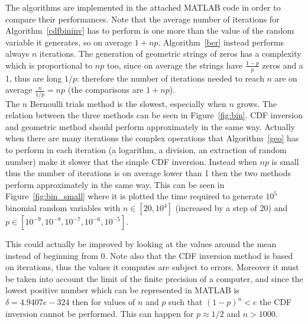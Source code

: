 \documentclass[10pt]{article}
\begin{document}
The algorithms are implemented in the attached MATLAB code in order to compare their performances. Note that the average number of iterations for Algorithm~\ref{cdfbininv} has to perform is one more than the value of the random variable it generates, so on average $1 + np$. Algorithm~\ref{ber} instead performs always $n$ iterations. The generation of geometric strings of zeros has a complexity which is proportional to $np$ too, since on average the strings have $\frac{1-p}{p}$ zeros and a 1, thus are long $1/p$: therefore the number of iterations needed to reach $n$ are on average $\frac{n}{1/p} = np$ (the comparisons are $1+np$). \\
The $n$ Bernoulli trials method is the slowest, especially when $n$ grows. The relation between the three methods can be seen in Figure~\ref{fig:bin}. CDF inversion and geometric method should perform approximately in the same way. Actually when there are many iterations the complex operations that Algorithm~\ref{geo} has to perform in each iteration (a logarithm, a division, an extraction of random number) make it slower that the simple CDF inversion. Instead when $np$ is small thus the number of iterations is on average lower than 1 then the two methods perform approximately in the same way. This can be seen in Figure~\ref{fig:bin_small} where it is plotted the time required to generate $10^5$ binomial random variables with $n\in [20, 10^4]$ (increased by a step of 20) and $p \in [10^{-9}, 10^{-8}, 10^{-7}, 10^{-6}, 10^{-5}]$.

This could actually be improved by looking at the values around the mean instead of beginning from 0. Note also that the CDF inversion method is based on iterations, thus the values it computes are subject to errors. Moreover it must be taken into account the limit of the finite precision of a computer, and since the lowest positive number which can be represented in MATLAB is $\delta = 4.9407e-324$ then for values of $n$ and $p$ such that $(1-p)^n < e$ the CDF inversion cannot be performed. This can happen for $p \approx 1/2$ and $n > 1000$.
\end{document}

